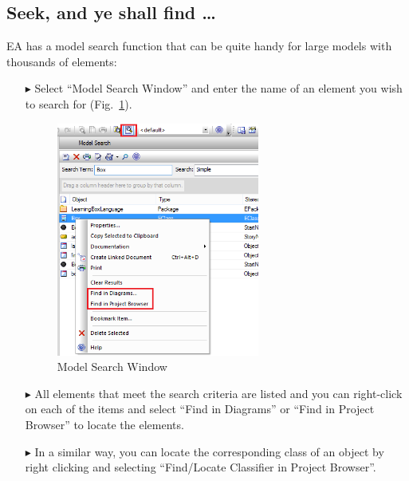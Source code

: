\subsection{Seek, and ye shall find \ldots}
EA has a model search function that can be quite handy for large models with thousands of elements:

\begin{enumerate}
\item[$\blacktriangleright$]Select ``Model Search Window'' and enter the name of an element you wish to search for (Fig.~\ref{fig_search01}).
\begin{figure}[htbp]
\begin{center}
  \includegraphics[width=0.63\textwidth]{search1}
  \caption{Model Search Window}  
  \label{fig_search01}
\end{center}
\end{figure}

\item[$\blacktriangleright$] All elements that meet the search criteria are listed and you can right-click on each of the items and select ``Find in Diagrams''
or  ``Find in Project Browser'' to locate the elements.

\item[$\blacktriangleright$] In a similar way, you can locate the corresponding class of an object by right clicking and selecting ``Find/Locate Classifier in
Project Browser''.

\end{enumerate}
